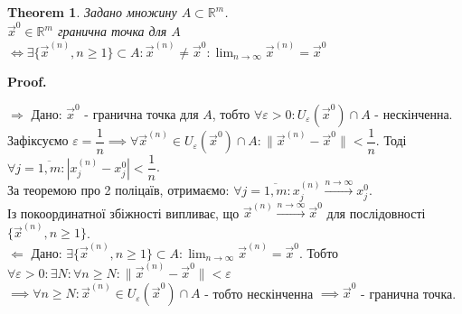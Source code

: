 \documentclass[a4paper, 10pt]{article}
\makeatletter
\def\huge{\displaystyle}
\def\qed{$\blacksquare$}
\def\rightproof{$\boxed{\Rightarrow}$ }
\def\leftproof{$\boxed{\Leftarrow}$ }
\theoremstyle{theoremdd}
\newtheorem{theorem}{Theorem}[subsection]
\theoremstyle{theoremdd}
\theoremstyle{theoremdd}
\theoremstyle{theoremdd}
\theoremstyle{theoremdd}
\theoremstyle{theoremdd}
\theoremstyle{theoremdd}
\theoremstyle{theoremdd}
\theoremstyle{theoremdd}
\renewenvironment{proof}[1][Proof.\\]{\par
\pushQED{\hfill \qed}%
\normalfont \topsep6\p@\@plus6\p@\relax
\trivlist
\item\relax
{\bfseries
#1\@addpunct{.}}\hspace\labelsep\ignorespaces
}{%
\popQED\endtrivlist\@endpefalse
}
\newcommand\Norm[1]{\lVert#1\rVert}
\makeatother
\begin{document}
\begin{theorem}
Задано множину $A \subset \mathbb{R}^m$.\\
$\vec{x}^0 \in \mathbb{R}^m$ гранична точка для $A$ $\iff \exists \{\vec{x}^{(n)}, n \geq 1\} \subset A: \vec{x}^{(n)} \neq \vec{x}^0: \huge \lim_{n \to \infty} \vec{x}^{(n)} = \vec{x}^0$\\
\end{theorem}

\begin{proof}
\rightproof Дано: $\vec{x}^0$ - гранична точка для $A$, тобто $\forall \varepsilon > 0: U_{\varepsilon}(\vec{x}^0) \cap A$ - нескінченна.\\
Зафіксуємо $\varepsilon = \dfrac{1}{n} \implies \forall \vec{x}^{(n)} \in U_{\varepsilon}(\vec{x}^0) \cap A: \Norm{\vec{x}^{(n)} - \vec{x}^0} < \dfrac{1}{n}$. Тоді $\forall j = \overline{1,m}: |x_j^{(n)} - x_j^0| < \dfrac{1}{n}$.\\
За теоремою про 2 поліцаїв, отримаємо: $\forall j = \overline{1,m}: x_j^{(n)} \overset{n \to \infty}{\longrightarrow} x_j^0$.\\
Із покоординатної збіжності випливає, що $\vec{x}^{(n)} \overset{n \to \infty}{\longrightarrow} \vec{x}^0$ для послідовності $\{\vec{x}^{(n)}, n \geq 1\}$.
\bigskip \\

\leftproof Дано: $\exists \{\vec{x}^{(n)}, n \geq 1\} \subset A: \huge \lim_{n \to \infty} \vec{x}^{(n)} = \vec{x}^0$. Тобто $\forall \varepsilon > 0: \exists N: \forall n \geq N: \Norm{\vec{x}^{(n)} - \vec{x}^0} < \varepsilon$\\
$\implies \forall n \geq N: \vec{x}^{(n)} \in U_\varepsilon(\vec{x}^0) \cap A$ - тобто нескінченна $\implies \vec{x}^{0}$ - гранична точка.
\end{proof}
\end{document}
